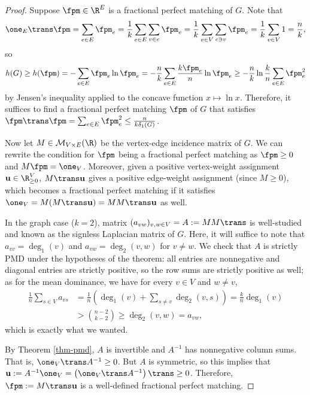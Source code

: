 \documentclass[11pt]{article}
\newcommand{\vw}{\mathbf{u}}
\begin{document}
\begin{proof}
    Suppose $\fpm\in\R^{E}$ is a fractional perfect matching of $G$. Note that
    \begin{equation}\label{eq-pm-sum}
        \one_{E}\trans\fpm=\sum_{e\in E}\fpm_e=\frac{1}{k}\sum_{e\in E}\sum_{v\in e}\fpm_{e}=\frac{1}{k}\sum_{v\in V}\sum_{e\ni v} \fpm_e=\frac{1}{k}\sum_{v\in V}1=\frac{n}{k},
    \end{equation}
    so
    $$h(G)\ge h(\fpm)=-\sum_{e\in E}\fpm_e\ln\fpm_e=-\frac{n}{k}\sum_{e\in E}\frac{k\fpm_e}{n}\ln\fpm_e\ge -\frac{n}{k}\ln\frac{k}{n}\sum_{e\in E}\fpm_e^2$$
    by Jensen's inequality applied to the concave function $x\mapsto\ln x$. Therefore, it suffices to find a fractional perfect matching $\fpm$ of $G$ that satisfies $\fpm\trans\fpm=\sum_{e\in E}\fpm_e^2\le \frac{n}{k\delta_1(G)}$.

    Now let $M\in\mathcal{M}_{V\times E}(\R)$ be the vertex-edge incidence matrix of $G$. We can rewrite the condition for $\fpm$ being a fractional perfect matching as $\fpm\ge0$ and $M\fpm=\one_V$. Moreover, given a positive vertex-weight assignment $\vw\in\R_{\ge0}^V$, $M\trans\vw$ gives a positive edge-weight assignment (since $M\ge0$), which becomes a fractional perfect matching if it satisfies $\one_V=M(M\trans\vw)=MM\trans\vw$ as well.
    
    In the graph case ($k=2$), matrix $(a_{vw})_{v,w\in V}=A:=MM\trans$ is well-studied and known as the signless Laplacian matrix of $G$. Here, it will suffice to note that $a_{vv}=\deg_1(v)$ and $a_{vw}=\deg_2(v,w)$ for $v\ne w$. We check that $A$ is strictly PMD under the hypotheses of the theorem: all entries are nonnegative and diagonal entries are strictly positive, so the row sums are strictly positive as well; as for the mean dominance, we have for every $v\in V$ and $w\ne v$,
    \begin{align*}
        \frac{1}{n}\sum_{s\in V}a_{vs}&=\frac{1}{n}\left(\deg_1(v)+\sum_{s\ne v}\deg_2(v,s)\right)=\frac{k}{n}\deg_1(v)\\&>\binom{n-2}{k-2}\ge\deg_2(v,w)=a_{vw},
    \end{align*}
    which is exactly what we wanted.

    By Theorem \ref{thm-pmd}, $A$ is invertible and $A^{-1}$ has nonnegative column sums. That is, $\one_V\trans A^{-1}\ge0$. But $A$ is symmetric, so this implies that $\vw:=A^{-1}\one_V=\left(\one_V\trans A^{-1}\right)\trans\ge0$. Therefore, $\fpm:=M\trans\vw$ is a well-defined fractional perfect matching.


\end{proof}
\end{document}

